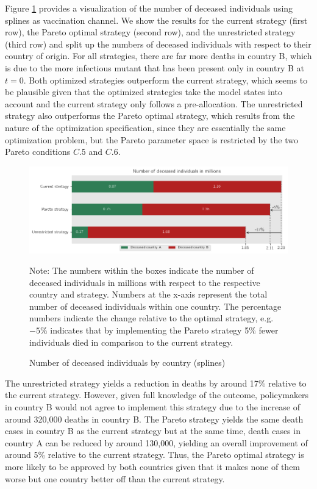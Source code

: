 Figure \ref{fig:results_splines_numbers} provides a visualization of the number of deceased individuals using splines as vaccination channel. We show the results for the current strategy (first row), the Pareto optimal strategy (second row), and the unrestricted strategy (third row) and split up the numbers of deceased individuals with respect to their country of origin. For all strategies, there are far more deaths in country B, which is due to the more infectious mutant that has been present only in country B at $t=0$. Both optimized strategies outperform the current strategy, which seems to be plausible given that the optimized strategies take the model states into account and the current strategy only follows a pre-allocation. The unrestricted strategy also outperforms the Pareto optimal strategy, which results from the nature of the optimization specification, since they are essentially the same optimization problem, but the Pareto parameter space is restricted by the two Pareto conditions $C.5$ and $C.6$. 
\begin{figure}[h!]
\centering
\includegraphics[scale=0.75]{images/splines_percentage_deviation.png}
\begin{flushleft}
\scriptsize{Note: The numbers within the boxes indicate the number of deceased individuals in millions with respect to the respective country and strategy. Numbers at the x-axis represent the total number of deceased individuals within one country. The percentage numbers indicate the change relative to the optimal strategy, e.g. $-5\%$ indicates that by implementing the Pareto strategy 5\% fewer individuals died in comparison to the current strategy.}
\end{flushleft}
\caption{Number of deceased individuals by country (splines)}
\label{fig:results_splines_numbers}
\end{figure}

The unrestricted strategy yields a reduction in deaths by around 17\% relative to the current strategy. However, given full knowledge of the outcome, policymakers in country B would not agree to implement this strategy due to the increase of around 320,000 deaths in country B. The Pareto strategy yields the same death cases in country B as the current strategy but at the same time, death cases in country A can be reduced by around 130,000, yielding an overall improvement of around 5\% relative to the current strategy. Thus, the Pareto optimal strategy is more likely to be approved by both countries given that it makes none of them worse but one country better off than the current strategy. \\

